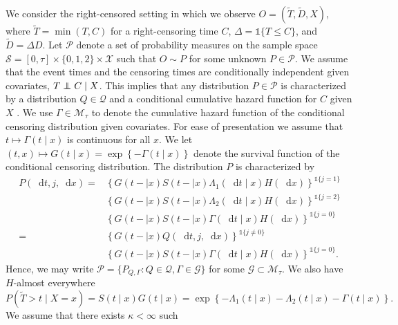\documentclass[alpha-refs]{wiley-article}
\newcommand\independent{\protect\mathpalette{\protect\independenT}{\perp}}
\def\independenT#1#2{\mathrel{\rlap{$#1#2$}\mkern2mu{#1#2}}}
\newcommand*\diff{\mathop{}\!\mathrm{d}}
\newcommand{\1}{\mathds{1}}
\newcommand{\sample}{\ensuremath{\mathcal{S}}}
\begin{document}
We consider the right-censored setting in which we observe \(O =
(\tilde{T},\tilde D, X)\), where $\tilde T = \min(T,C)$ for a
right-censoring time \(C\), $\Delta = \1{\{T \leq C\}}$, and \(\tilde
D=\Delta D\). Let \(\mathcal{P}\) denote a set of probability measures
on the sample space \(\sample = [0, \tau] \times \{0, 1, 2\}
\times \mathcal{X}\) such that \(O \sim P \) for some unknown \(P\in
\mathcal{P}\). We assume that the event times and the censoring times
are conditionally independent given covariates, \( T \independent C
\mid X \). This implies that any distribution \( P \in \mathcal{P} \)
is characterized by a distribution \( Q \in \mathcal{Q} \) and a
conditional cumulative hazard function for \( C \) given \( X \)
\citep[c.f.,][]{begun1983information,gill1997coarsening}. We use
\(\Gamma\in\mathcal{M}_{\tau}\) to denote the cumulative hazard
function of the conditional censoring distribution given
covariates. For ease of presentation we assume that \(t\mapsto
\Gamma(t \mid x) \) is continuous for all \( x \). We let
\((t,x)\mapsto G(t \mid x)=\exp\left\{-\Gamma(t \mid x)\right\}\)
denote the survival function of the conditional censoring
distribution. The distribution \( P \) is characterized by
\begin{equation}\label{eq:parametrizeP}
  \begin{split}
    P(\diff t, j, \diff x) =& \left\{G(t- \mid x)S(t- \mid x)\Lambda_1(\diff t \mid x)H(\diff x)\right\}^{\1{{\{j=1\}}}}\\
                            & \left\{G(t- \mid x)S(t- \mid x)\Lambda_2(\diff t \mid x)H(\diff x)\right\}^{\1{{\{j=2\}}}}\\
                            & \left\{G(t- \mid x)S(t- \mid x)\Gamma(\diff t \mid x)H(\diff x)\right\}^{\1{{\{j=0\}}}}\\
    = & \left\{G(t- \mid x)Q(\diff t,j,\diff x)\right\}^{\1{{\{j\ne 0\}}}}\\    
                            & \left\{G(t- \mid x)S(t- \mid x)\Gamma(\diff t \mid x)H(\diff x)\right\}^{\1{{\{j=0\}}}}.
  \end{split}
\end{equation}
Hence, we may write
\( \mathcal{P} = \{ P_{Q, \Gamma} : Q \in \mathcal{Q}, \Gamma \in
\mathcal{G} \} \) for some \( \mathcal{G} \subset \mathcal{M}_{\tau} \). We
also have \(H\)-almost everywhere
\begin{equation*}
P(\tilde T>t \mid X=x) = S(t \mid x)G(t \mid x) = \exp\left\{-\Lambda_{1}(t \mid x)-\Lambda_{2}(t \mid x)-\Gamma(t \mid x) \right\}.
\end{equation*} We assume that there exists \(\kappa<\infty\) such
\end{document}

